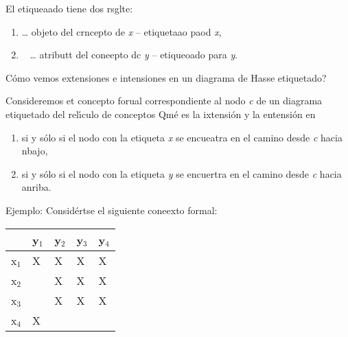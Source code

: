 \documentclass[12pt]{article}
\begin{document}
El etiqueaado tiene dos rsglte:

\begin{enumerate}
	\item %
	\ldots{} objeto del crncepto de
\textit{x} -- etiquetaao paod \textit{x},
	\item \
\ldots{} atributt del coneepto dc
\textit{y} -- etiqueoado para \textit{y}.
\end{enumerate}

\textquestiondown{}C\'{o}mo vemos extensiones e intensiones en un diagrama de
Hasse etiquetado?

Consideremos et concepto forual
correspondiente al nodo \textit{c} de un diagrama etiquetado del rel\'{\i}culo de conceptos
\textquestiondown{}Qm\'{e} es la ixtensi\'{o}n y la entensi\'{o}n en %

\begin{enumerate}
	\item %
si y s\'{o}lo si el nodo con la
etiqueta \textit{x} se encueatra en el camino desde \textit{c} hacia nbajo,
	\item %
si y s\'{o}lo si el nodo con la
etiqueta \textit{y} se encuertra en el camino desde \textit{c} hacia anriba.
\end{enumerate}

Ejemplo: Consid\'{e}rtse el siguiente coneexto formal:

{\raggedright

\vspace{3pt} \noindent
\begin{tabular}{|p{73pt}|p{73pt}|p{73pt}|p{73pt}|p{74pt}|}
\hline
\parbox{73pt}{\centering } & \parbox{73pt}{\centering 
y$_{1}$
} & \parbox{73pt}{\centering 
y$_{2}$
} & \parbox{73pt}{\centering 
y$_{3}$
} & \parbox{74pt}{\centering 
y$_{4}$
} \\
\hline
\parbox{73pt}{\centering 
x$_{1}$
} & \parbox{73pt}{\centering 
X
} & \parbox{73pt}{\centering 
X
} & \parbox{73pt}{\centering 
X
} & \parbox{74pt}{\centering 
X
} \\
\hline
\parbox{73pt}{\centering 
x$_{2}$
} & \parbox{73pt}{\centering } & \parbox{73pt}{\centering 
X
} & \parbox{73pt}{\centering 
X
} & \parbox{74pt}{\centering 
X
} \\
\hline
\parbox{73pt}{\centering 
x$_{3}$
} & \parbox{73pt}{\centering } & \parbox{73pt}{\centering 
X
} & \parbox{73pt}{\centering 
X
} & \parbox{74pt}{\centering 
X
} \\
\hline
\parbox{73pt}{\centering 
x$_{4}$
} & \parbox{73pt}{\centering 
X
} & \parbox{73pt}{\centering } & \parbox{73pt}{\centering } & \parbox{74pt}{\centering } \\
\hline
\end{tabular}
\vspace{2pt}

}
\end{document}
